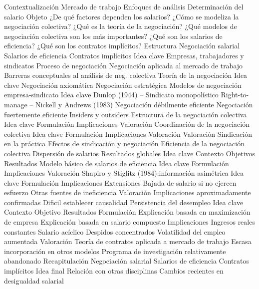 \documentclass{nuevotema}
\begin{document}
\esquemacorto

\begin{esquema}[enumerate]
	\1[] 
		\2 Contextualización
			\3 Mercado de trabajo
			\3 Enfoques de análisis
			\3 Determinación del salario
		\2 Objeto
			\3 ¿De qué factores dependen los salarios?
			\3 ¿Cómo se modeliza la negociación colectiva?
			\3 ¿Qué es la teoría de la negociación?
			\3 ¿Qué modelos de negociación colectiva son los más importantes?
			\3 ¿Qué son los salarios de eficiencia?
			\3 ¿Qué son los contratos implícitos?
		\2 Estructura
			\3 Negociación salarial
			\3 Salarios de eficiencia
			\3 Contratos implícitos
	\1 
		\2 Idea clave
			\3 Empresas, trabajadores y sindicatos
			\3 Proceso de negociación
			\3 Negociación aplicada al mercado de trabajo
			\3 Barreras conceptuales al análisis de neg. colectiva
		\2 Teoría de la negociación
			\3 Idea clave
			\3 Negociación axiomática
			\3 Negociación estratégica
		\2 Modelos de negociación empresa-sindicato
			\3 Idea clave
			\3 Dunlop (1944) -- Sindicato monopolístico
			\3 Right-to-manage -- Nickell y Andrews (1983)
			\3 Negociación débilmente eficiente
			\3 Negociación fuertemente eficiente
			\3 Insiders y outsiders
		\2 Estructura de la negociación colectiva
			\3 Idea clave
			\3 Formulación
			\3 Implicaciones
			\3 Valoración
		\2 Coordinación de la negociación colectiva
			\3 Idea clave
			\3 Formulación
			\3 Implicaciones
			\3 Valoración
		\2 Valoración
			\3 Sindicación en la práctica
			\3 Efectos de sindicación y negociación
			\3 Eficiencia de la negociación colectiva
			\3 Dispersión de salarios
			\3 Resultados globales
	\1 
		\2 Idea clave
			\3 Contexto
			\3 Objetivos
			\3 Resultados
		\2 Modelo básico de salarios de eficiencia
			\3 Idea clave
			\3 Formulación
			\3 Implicaciones
			\3 Valoración
		\2 Shapiro y Stiglitz (1984):información asimétrica
			\3 Idea clave
			\3 Formulación
			\3 Implicaciones
		\2 Extensiones
			\3 Bajada de salario si no ejercen esfuerzo
			\3 Otras fuentes de ineficiencia
		\2 Valoración
			\3 Implicaciones aproximadamente confirmadas
			\3 Dificil establecer causalidad
			\3 Persistencia del desempleo
	\1 
		\2 Idea clave
			\3 Contexto
			\3 Objetivo
			\3 Resultados
		\2 Formulación
			\3 Explicación basada en maximización de empresa
			\3 Explicación basada en salario compuesto
		\2 Implicaciones
			\3 Ingresos reales constantes
			\3 Salario acíclico
			\3 Despidos concentrados
			\3 Volatilidad del empleo aumentada
		\2 Valoración
			\3 Teoría de contratos aplicada a mercado de trabajo
			\3 Escasa incorporación en otros modelos
			\3 Programa de investigación relativamente abandonado
	\1[] 
		\2 Recapitulación
			\3 Negociación salarial
			\3 Salarios de eficiencia
			\3 Contratos implícitos
		\2 Idea final
			\3 Relación con otras disciplinas
			\3 Cambios recientes en desigualdad salarial

\end{esquema}
\end{document}
